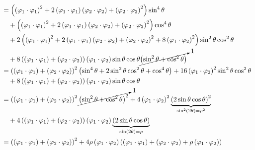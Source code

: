 \documentclass{article}[a4]
\begin{document}
\begin{align*}
  &= \left( \left( \varphi_1\cdot\varphi_1 \right)^2 + 2 \left( \varphi_1\cdot\varphi_1 \right) \left( \varphi_2\cdot\varphi_2 \right) + \left( \varphi_2\cdot\varphi_2 \right)^2 \right) \sin^4 \theta \\
    & \quad + \left( \left( \varphi_1\cdot\varphi_1 \right)^2 + 2 \left( \varphi_1\cdot\varphi_1 \right) \left( \varphi_2\cdot\varphi_2 \right) + \left( \varphi_2\cdot\varphi_2 \right)^2 \right) \cos^4 \theta \\
    & \quad + 2 \left( \left( \varphi_1\cdot\varphi_1 \right)^2 + 2 \left( \varphi_1\cdot\varphi_1 \right) \left( \varphi_2\cdot\varphi_2 \right) + \left( \varphi_2\cdot\varphi_2 \right)^2+ 8 \left( \varphi_1\cdot\varphi_2 \right)^2  \right) \sin^2 \theta \cos^2 \theta \\
  & \quad + 8 \left( \left( \varphi_1\cdot\varphi_1 \right) + \left( \varphi_2\cdot\varphi_2 \right)  \right) \left( \varphi_1\cdot\varphi_2 \right) \sin \theta \cos \theta \cancelto{1}{\left( \sin^2 \theta + \cos^2 \theta \right)} \\
  &= \left( \left( \varphi_1\cdot\varphi_1 \right) + \left( \varphi_2\cdot\varphi_2 \right) \right)^2 \left( \sin^4 \theta + 2 \sin^2 \theta \cos^2 \theta + \cos^4 \theta \right) + 16 \left( \varphi_1\cdot\varphi_2 \right)^2 \sin^2 \theta \cos^2 \theta \\
    & \quad + 8 \left( \left( \varphi_1\cdot\varphi_1 \right) + \left( \varphi_2\cdot\varphi_2 \right)  \right) \left( \varphi_1\cdot\varphi_2 \right) \sin \theta \cos \theta \\
  &= \left( \left( \varphi_1\cdot\varphi_1 \right) + \left( \varphi_2\cdot\varphi_2 \right) \right)^2 \cancelto{1}{\left( \sin^2 \theta + \cos^2 \theta \right)^2} + 4 \left( \varphi_1\cdot\varphi_2 \right)^2 \underbrace{\left( 2 \sin \theta \cos \theta \right)^2}_{\sin^2 (2 \theta) = \rho^2} \\
    & \quad + 4 \left( \left( \varphi_1\cdot\varphi_1 \right) + \left( \varphi_2\cdot\varphi_2 \right)  \right) \left( \varphi_1\cdot\varphi_2 \right) \underbrace{\left( 2 \sin \theta \cos \theta \right)}_{\sin (2 \theta) = \rho} \\
  &= \left( \left( \varphi_1\cdot\varphi_1 \right) + \left( \varphi_2\cdot\varphi_2 \right) \right)^2 + 4 \rho \left( \varphi_1\cdot\varphi_2 \right) \left( \left( \varphi_1\cdot\varphi_1 \right) + \left( \varphi_2\cdot\varphi_2 \right) + \rho \left( \varphi_1\cdot\varphi_2 \right) \right) \\
\end{align*}
\end{document}
